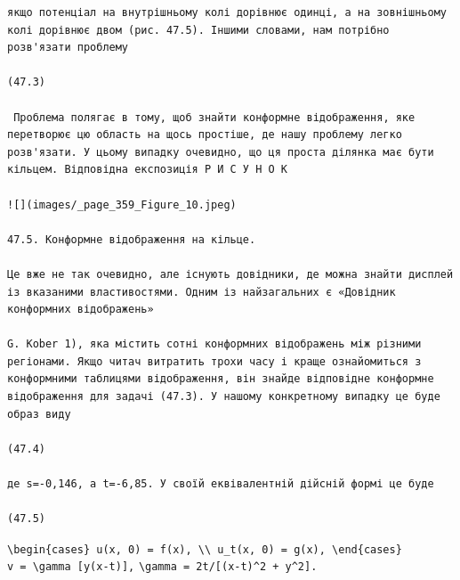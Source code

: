 \documentclass[
  ukrainian,
]{article}
\begin{document}
\begin{verbatim}
якщо потенціал на внутрішньому колі дорівнює одинці, а на зовнішньому колі дорівнює двом (рис. 47.5). Іншими словами, нам потрібно розв'язати проблему

(47.3)

 Проблема полягає в тому, щоб знайти конформне відображення, яке перетворює цю область на щось простіше, де нашу проблему легко розв'язати. У цьому випадку очевидно, що ця проста ділянка має бути кільцем. Відповідна експозиція Р И С У Н О К

![](images/_page_359_Figure_10.jpeg)

47.5. Конформне відображення на кільце.

Це вже не так очевидно, але існують довідники, де можна знайти дисплей із вказаними властивостями. Одним із найзагальних є «Довідник конформних відображень»

G. Kober 1), яка містить сотні конформних відображень між різними регіонами. Якщо читач витратить трохи часу і краще ознайомиться з конформними таблицями відображення, він знайде відповідне конформне відображення для задачі (47.3). У нашому конкретному випадку це буде образ виду

(47.4)

де s=-0,146, а t=-6,85. У своїй еквівалентній дійсній формі це буде

(47.5)
\end{verbatim}

\texttt{\textbackslash{}begin\{cases\}\ u(x,\ 0)\ =\ f(x),\ \textbackslash{}\textbackslash{}\ u\_t(x,\ 0)\ =\ g(x),\ \textbackslash{}end\{cases\}}
\texttt{v\ =\ \textbackslash{}gamma\ {[}y(x-t){]},}
\texttt{\textbackslash{}gamma\ =\ 2t/{[}(x-t)\^{}2\ +\ y\^{}2{]}.}
\end{document}
